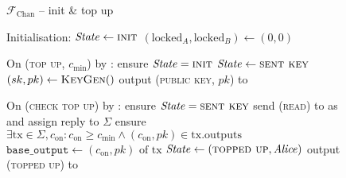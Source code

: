 \begin{figure}[H]
  \begin{systembox}{$\mathcal{F}_{\mathrm{Chan}}$ -- init \& top up}
    \begin{algorithmic}[1]
      \State Initialisation: 
      \Indent
        \State $\mathit{State} \gets \textsc{init}$
        \State $(\mathrm{locked}_A, \mathrm{locked}_B) \gets (0, 0)$
      \EndIndent
      \Statex

      \State On (\textsc{top up}, $c_{\mathrm{min}}$) by \alice:
      \label{code:functionality:chan:skeleton:init:top_up:start}
      \Indent
        \State ensure $\mathit{State} = \textsc{init}$
        \State $\mathit{State} \gets \textsc{sent key}$
        \State $(sk, pk) \gets \textsc{KeyGen}()$
        \State output (\textsc{public key}, $pk$) to \alice
        \label{code:functionality:chan:skeleton:init:top_up:end}
      \EndIndent
      \Statex

      \State On (\textsc{check top up}) by \alice:
      \label{code:functionality:chan:skeleton:init:check_top_up:start}
      \Indent
        \State ensure $\mathit{State} = \textsc{sent key}$
        \State send (\textsc{read}) to \ledger as \alice and assign reply to
        $\Sigma$
        \State ensure $\exists \mathrm{tx} \in \Sigma, c_{\mathrm{on}}:
        c_{\mathrm{on}} \geq c_{\mathrm{min}} \wedge (c_{\mathrm{on}}, pk) \in
        \mathrm{tx.outputs}$
        \State $\mathtt{base\_output} \gets (c_{\mathrm{on}}, pk) \text{ of tx}$
        \State $\mathit{State} \gets (\textsc{topped up}, \mathit{Alice})$
        \State output (\textsc{topped up}) to \alice
        \label{code:functionality:chan:skeleton:init:check_top_up:end}
      \EndIndent
    \end{algorithmic}
  \end{systembox}
  \caption{}
  \label{code:functionality:chan:skeleton:init}
\end{figure}

